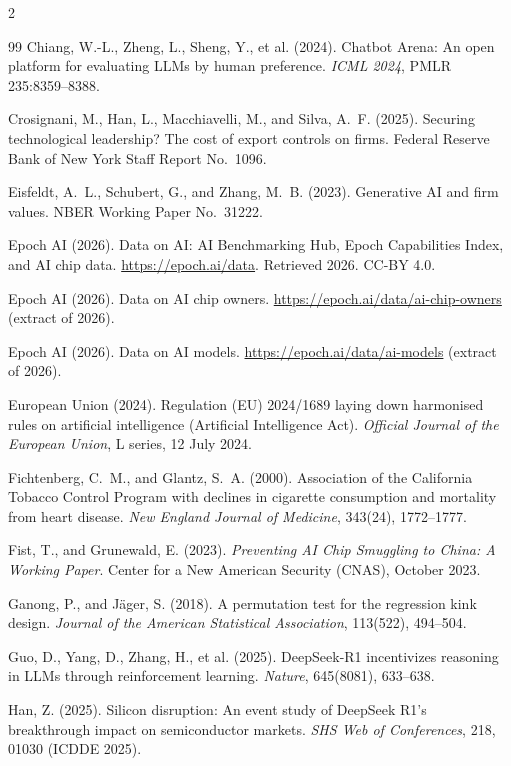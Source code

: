 \documentclass[11pt]{article}
\begin{document}
\begin{multicols}{2}
\begin{thebibliography}{99}
Chiang, W.-L., Zheng, L., Sheng, Y., et al. (2024).
Chatbot Arena: An open platform for evaluating LLMs by human preference.
\emph{ICML 2024}, PMLR 235:8359--8388.

Crosignani, M., Han, L., Macchiavelli, M., and Silva, A.~F. (2025).
Securing technological leadership? The cost of export controls on firms.
Federal Reserve Bank of New York Staff Report No.~1096.

Eisfeldt, A.~L., Schubert, G., and Zhang, M.~B. (2023).
Generative AI and firm values.
NBER Working Paper No.~31222.

Epoch AI (2026).
Data on AI: AI Benchmarking Hub, Epoch Capabilities Index, and AI chip data.
\url{https://epoch.ai/data}. Retrieved 2026. CC-BY 4.0.

Epoch AI (2026).
Data on AI chip owners.
\url{https://epoch.ai/data/ai-chip-owners} (extract of 2026).

Epoch AI (2026).
Data on AI models.
\url{https://epoch.ai/data/ai-models} (extract of 2026).

European Union (2024).
Regulation (EU) 2024/1689 laying down harmonised rules on artificial
intelligence (Artificial Intelligence Act).
\emph{Official Journal of the European Union}, L series, 12 July 2024.

Fichtenberg, C.~M., and Glantz, S.~A. (2000).
Association of the California Tobacco Control Program with declines in
cigarette consumption and mortality from heart disease.
\emph{New England Journal of Medicine}, 343(24), 1772--1777.

Fist, T., and Grunewald, E. (2023).
\emph{Preventing AI Chip Smuggling to China: A Working Paper}.
Center for a New American Security (CNAS), October 2023.

Ganong, P., and J\"ager, S. (2018).
A permutation test for the regression kink design.
\emph{Journal of the American Statistical Association}, 113(522), 494--504.

Guo, D., Yang, D., Zhang, H., et al. (2025).
DeepSeek-R1 incentivizes reasoning in LLMs through reinforcement learning.
\emph{Nature}, 645(8081), 633--638.

Han, Z. (2025).
Silicon disruption: An event study of DeepSeek R1's breakthrough impact on
semiconductor markets.
\emph{SHS Web of Conferences}, 218, 01030 (ICDDE 2025).


\end{thebibliography}
\end{multicols}
\end{document}
